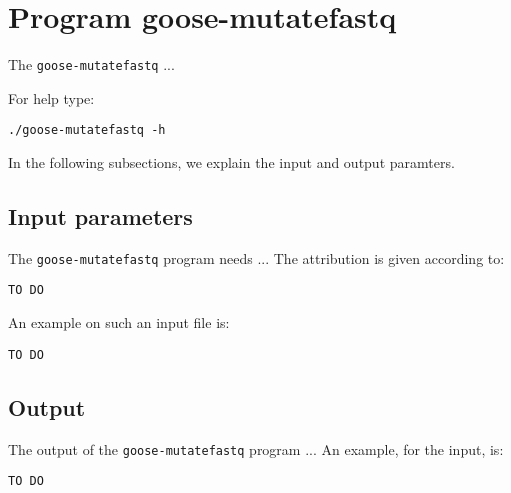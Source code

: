 \section{Program goose-mutatefastq}
The \texttt{goose-mutatefastq} ...

For help type:
\begin{lstlisting}
./goose-mutatefastq -h
\end{lstlisting}
In the following subsections, we explain the input and output paramters.

\subsection{Input parameters}

The \texttt{goose-mutatefastq} program needs ...
The attribution is given according to:
\begin{lstlisting}
TO DO
\end{lstlisting}

An example on such an input file is:
\begin{lstlisting}
TO DO
\end{lstlisting}

\subsection{Output}
The output of the \texttt{goose-mutatefastq} program ...
An example, for the input, is:
\begin{lstlisting}
TO DO
\end{lstlisting}
